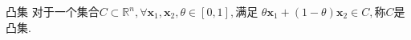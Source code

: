 
\begin{definition}{凸集}
对于一个集合$C\subset\mathbb{R}^n,\forall\boldsymbol{x}_1,\boldsymbol{x}_2,\theta\in[0,1],$满足
$\theta\boldsymbol{x}_1+(1-\theta)\boldsymbol{x}_2\in C,$称$C$是凸集.
\end{definition}